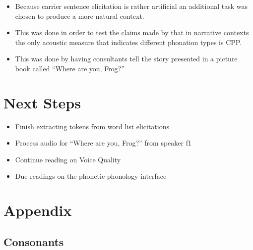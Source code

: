 \documentclass[12pt, letterpaper]{article}
\begin{document}
\begin{itemize}
	\item Because carrier sentence elicitation is rather artificial an additional task was chosen to produce a more natural context. 
	\item This was done in order to test the claims made by \citet{garellekPhoneticsWhiteHmong2021} that in narrative contexts the only acoustic measure that indicates different phonation types is CPP.
	\item This was done by having consultants tell the story presented in a picture book called ``Where are you, Frog?''
\end{itemize}
\section{Next Steps} \label{sec:Methodology}
\begin{itemize}
	\item Finish extracting tokens from word list elicitations
	\item Process audio for ``Where are you, Frog?'' from speaker f1
	\item Continue reading \citet{eslingVoiceQualityLaryngeal2019} on Voice Quality
	\item Due readings on the phonetic-phonology interface \citep{keatingPhonologyphoneticsInterface1996,kingstonPhoneticsPhonologyInterface2007,zsigaPhonologyPhoneticsInterface2020}
\end{itemize}


\printbibliography[heading=bibintoc]


\section*{Appendix} 
\subsection*{Consonants} \label{sec:Consonants}
\end{document}
